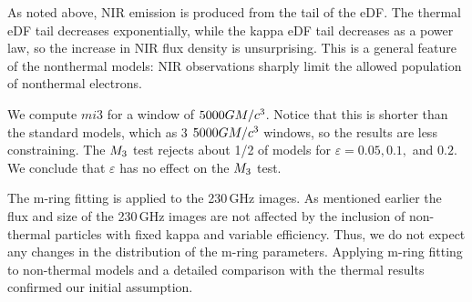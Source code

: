 As noted above, NIR emission is produced from the tail of the eDF.  The thermal eDF tail decreases exponentially, while the kappa eDF tail decreases as a power law, so the increase in NIR flux density is unsurprising.  This is a general feature of the nonthermal models: NIR observations sharply limit the allowed population of nonthermal electrons.


We compute $mi{3}$ for a window of $5000GM/c^3$.  Notice that this is shorter than the standard models, which as $3$ $5000GM/c^3$ windows, so the results are less constraining.  The $M_{3}$ test rejects about 1/2 of models for $\varepsilon = 0.05, 0.1,$ and $0.2$.  We conclude that $\varepsilon$ has no effect on the $M_{3}$ test.



The m-ring fitting is applied to the 230\,GHz images. As mentioned earlier the flux and size of the 230\,GHz images are not affected by the inclusion of non-thermal particles with fixed kappa and variable efficiency. Thus, we do not expect any changes in the distribution of the m-ring parameters.  Applying m-ring fitting to non-thermal models and a detailed comparison with the thermal results confirmed our initial assumption.


